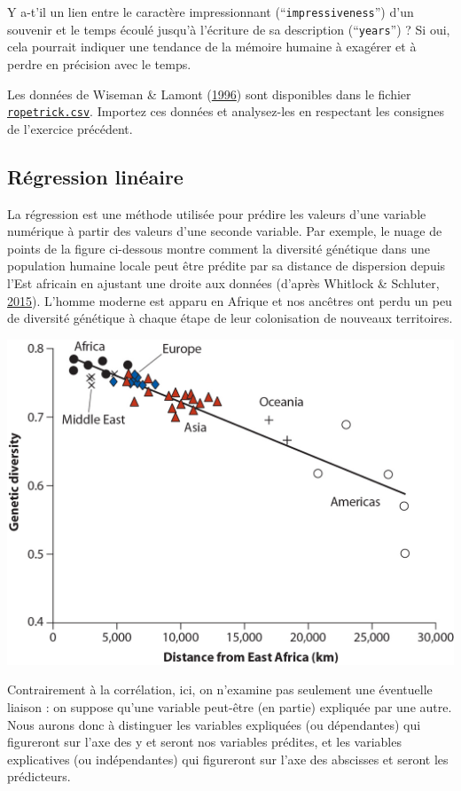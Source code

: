 \documentclass[
  a4paper,
]{article}
\begin{document}
Y a-t'il un lien entre le caractère impressionnant (``\texttt{impressiveness}'') d'un souvenir et le temps écoulé jusqu'à l'écriture de sa description (``\texttt{years}'') ? Si oui, cela pourrait indiquer une tendance de la mémoire humaine à exagérer et à perdre en précision avec le temps.

Les données de Wiseman \& Lamont (\protect\hyperlink{ref-wiseman1996}{1996}) sont disponibles dans le fichier \href{https://besibo.github.io/Biometrie3/data/ropetrick.csv}{\texttt{ropetrick.csv}}. Importez ces données et analysez-les en respectant les consignes de l'exercice précédent.

\hypertarget{ruxe9gression-linuxe9aire}{%
\subsection{Régression linéaire}\label{ruxe9gression-linuxe9aire}}

La régression est une méthode utilisée pour prédire les valeurs d'une variable numérique à partir des valeurs d'une seconde variable. Par exemple, le nuage de points de la figure ci-dessous montre comment la diversité génétique dans une population humaine locale peut être prédite par sa distance de dispersion depuis l'Est africain en ajustant une droite aux données (d'après Whitlock \& Schluter, \protect\hyperlink{ref-whitlock2015}{2015}). L'homme moderne est apparu en Afrique et nos ancêtres ont perdu un peu de diversité génétique à chaque étape de leur colonisation de nouveaux territoires.

\includegraphics{images/genetics.jpg}

Contrairement à la corrélation, ici, on n'examine pas seulement une éventuelle liaison : on suppose qu'une variable peut-être (en partie) expliquée par une autre. Nous aurons donc à distinguer les variables expliquées (ou dépendantes) qui figureront sur l'axe des y et seront nos variables prédites, et les variables explicatives (ou indépendantes) qui figureront sur l'axe des abscisses et seront les prédicteurs.
\end{document}
